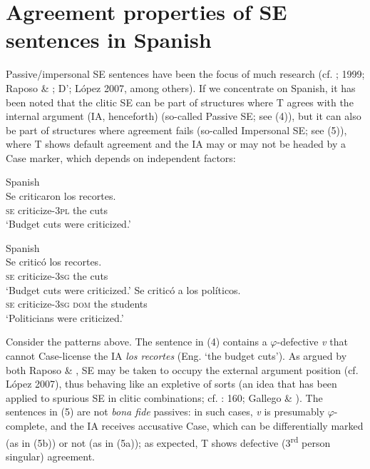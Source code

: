 \documentclass[output=paper]{langsci/langscibook}
\begin{document}
\section{Agreement properties of SE sentences in Spanish}%

Passive/impersonal SE sentences have been the focus of much research (cf. \citealt{Mendikoetxea1992}; 1999; Raposo \& \citealt{Uriagereka1996}; D’\citealt{Alessandro2007}; López 2007, among others). If we concentrate on Spanish, it has been noted that the clitic SE can be part of structures where T agrees with the internal argument (IA, henceforth) (so-called Passive SE; see (4)), but it can also be part of structures where agreement fails (so-called Impersonal SE; see (5)), where T shows default agreement and the IA may or may not be headed by a Case marker, which depends on independent factors:

\ea%
    Spanish\label{ex:key:4}\\
    \gll Se  criticaron        los recortes.        \\
         \textsc{se} criticize-\textsc{3pl}  the cuts\\
    \glt ‘Budget cuts were criticized.’
    \z

\ea%
    Spanish\label{ex:key:5}\\
    \ea
    \gll Se   criticó             los  recortes.      \\
          \textsc{se}  criticize-\textsc{3sg}  the  cuts\\
    \glt ‘Budget cuts were criticized.’
    \ex
    \gll Se  criticó             a        los  políticos.           \\
         \textsc{se}  criticize-\textsc{3sg}  \textsc{dom} the students\\
    \glt ‘Politicians were criticized.’
    \z
\z

Consider the patterns above. The sentence in (4) contains a $\varphi $-defective \textit{v} that cannot Case-license the IA \textit{los recortes} (Eng. ‘the budget cuts’). As argued by both Raposo \& \citet{Uriagereka1996}, SE may be taken to occupy the external argument position (cf. López 2007), thus behaving like an expletive of sorts (an idea that has been applied to spurious SE in clitic combinations; cf. \citealt{Kayne2000}: 160; Gallego \& \citealt{Uriagereka2017}). The sentences in (5) are not \textit{bona fide} passives: in such cases, \textit{v} is presumably $\varphi $-complete, and the IA receives accusative Case, which can be differentially marked (as in (5b)) or not (as in (5a)); as expected, T shows defective (3\textsuperscript{rd} person singular) agreement.
\end{document}

